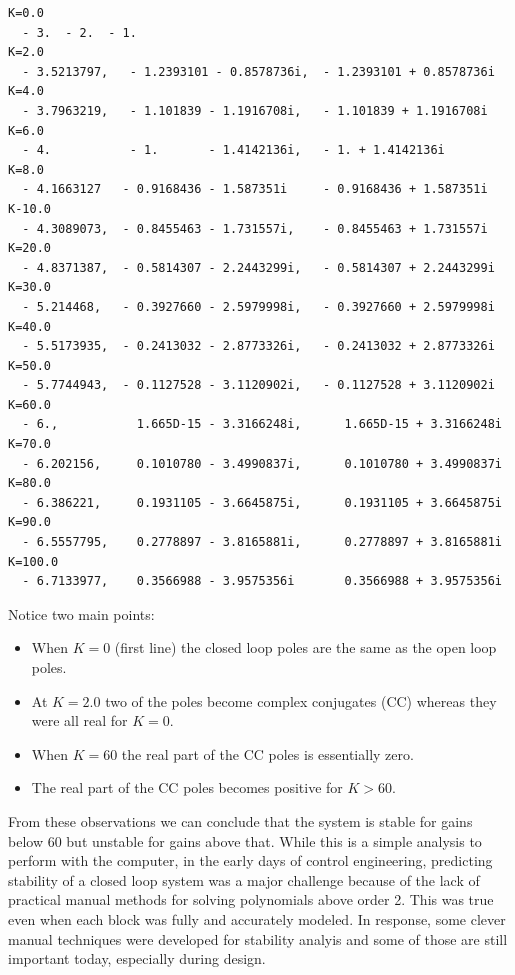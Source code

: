\begin{verbatim}
K=0.0
  - 3.  - 2.  - 1.
K=2.0
  - 3.5213797,   - 1.2393101 - 0.8578736i,  - 1.2393101 + 0.8578736i
K=4.0
  - 3.7963219,   - 1.101839 - 1.1916708i,   - 1.101839 + 1.1916708i
K=6.0
  - 4.           - 1.       - 1.4142136i,   - 1. + 1.4142136i
K=8.0
  - 4.1663127   - 0.9168436 - 1.587351i     - 0.9168436 + 1.587351i
K-10.0
  - 4.3089073,  - 0.8455463 - 1.731557i,    - 0.8455463 + 1.731557i
K=20.0
  - 4.8371387,  - 0.5814307 - 2.2443299i,   - 0.5814307 + 2.2443299i
K=30.0
  - 5.214468,   - 0.3927660 - 2.5979998i,   - 0.3927660 + 2.5979998i
K=40.0
  - 5.5173935,  - 0.2413032 - 2.8773326i,   - 0.2413032 + 2.8773326i
K=50.0
  - 5.7744943,  - 0.1127528 - 3.1120902i,   - 0.1127528 + 3.1120902i
K=60.0
  - 6.,           1.665D-15 - 3.3166248i,      1.665D-15 + 3.3166248i
K=70.0
  - 6.202156,     0.1010780 - 3.4990837i,      0.1010780 + 3.4990837i
K=80.0
  - 6.386221,     0.1931105 - 3.6645875i,      0.1931105 + 3.6645875i
K=90.0
  - 6.5557795,    0.2778897 - 3.8165881i,      0.2778897 + 3.8165881i
K=100.0
  - 6.7133977,    0.3566988 - 3.9575356i       0.3566988 + 3.9575356i

\end{verbatim}

Notice two main points:

\begin{itemize}
  \item When $K=0$ (first line) the closed loop poles are the same as the open loop poles.
  \item At $K=2.0$ two of the poles become complex conjugates (CC) whereas they were all real for $K=0$.
  \item When $K=60$ the real part of the CC poles is essentially zero.
  \item The real part of the CC poles becomes positive for $K>60$.
\end{itemize}


 From these observations we can conclude that the system is stable for gains below 60 but unstable for gains above that.  While this is a simple analysis to perform with the computer, in the early days of control engineering,  predicting stability of a closed loop system
 was a major challenge because of the lack of practical manual methods for solving polynomials above order 2.
 This was true even when each block was fully and accurately modeled.
 In response, some clever manual  techniques were developed for stability analyis and some of those are still important today, especially during design.



